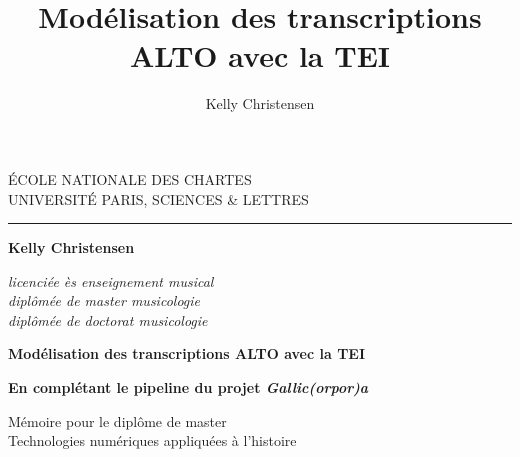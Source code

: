 \documentclass[a4paper,12pt,twoside]{book}
\author{Kelly Christensen}
\title{Modélisation des transcriptions ALTO avec la TEI}
\begin{document}
	\begin{titlepage}
		\begin{center}
			
			\bigskip
			
			\begin{large}				
				ÉCOLE NATIONALE DES CHARTES\\
				UNIVERSITÉ PARIS, SCIENCES \& LETTRES
			\end{large}
			\begin{center}\rule{2cm}{0.02cm}\end{center}
			
			\bigskip
			\bigskip
			\bigskip
			\begin{Large}
				\textbf{Kelly Christensen}\\
			\end{Large}
			\begin{normalsize} \textit{licenciée ès enseignement musical}\\
				\textit{diplômée de master musicologie}\\
				\textit{diplômée de doctorat musicologie}
			\end{normalsize}
			
			\bigskip
			\bigskip
			\bigskip
			
			\begin{Huge}
				\textbf{Modélisation des transcriptions ALTO avec la TEI}\\
			\end{Huge}
			\bigskip
			\bigskip
			\begin{LARGE}
				\textbf{En complétant le pipeline du projet \textit{Gallic(orpor)a}}\\
			\end{LARGE}
			
			\bigskip
			\bigskip
			\bigskip
			\begin{large}
			\end{large}
			\vfill
			
			\begin{large}
				Mémoire 
				pour le diplôme de master \\
				\og{} Technologies numériques appliquées à l'histoire \fg{} \\
			\end{large}
			
		\end{center}
	\end{titlepage}
	
	\thispagestyle{empty}	
	\cleardoublepage
	
\end{document}
